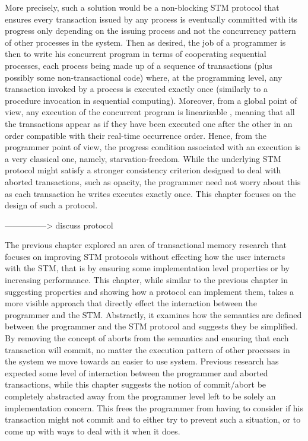 More precisely, such a solution would be a non-blocking STM protocol that ensures every transaction
issued by any process is eventually committed with its progress only depending
on the issuing process and not the concurrency pattern of other processes in the system.
Then as desired, the job of a
programmer is then to write his concurrent program in terms of cooperating sequential
processes, each process being made up of a sequence of transactions (plus possibly
some non-transactional code) where,
at the programming level, any transaction invoked by
a process is executed exactly once (similarly to a procedure invocation in sequential
computing).
Moreover, from a global point of view, any execution of the concurrent
program is linearizable \cite{HW90}, meaning that all the transactions appear as if they have
been executed one after the other in an order compatible with their real-time occurrence
order. Hence, from the programmer point of view, the progress condition associated
with an execution is a very classical one, namely, starvation-freedom.
While the underlying STM protocol might satisfy a stronger consistency criterion
designed to deal with aborted transactions,
such as opacity, the programmer need not worry about this as each transaction
he writes executes exactly once.
This chapter focuses on the design of such a protocol.

---------------> discuss protocol

The previous chapter explored an area of transactional memory
research that focuses on improving STM protocols without effecting
how the user interacts with the STM, that is by ensuring some implementation
level properties or by increasing performance.
This chapter, while similar to the previous chapter in suggesting properties
and showing how a protocol can implement them,
takes a more visible approach
that directly effect the interaction between the programmer and
the STM.
Abstractly, it examines how the semantics are defined between
the programmer and the STM protocol and suggests they be simplified.
By removing the concept of aborts from the semantics and
ensuring that each transaction will commit, no matter the 
execution pattern of other processes in the system
we move towards an easier to use system.
Previous research has expected some level of interaction
between the programmer and aborted transactions, while this
chapter suggests the notion of commit/abort be completely abstracted
away from the programmer level left to be solely an implementation
concern.
This frees the programmer from having to consider if his transaction
might not commit and to either try to prevent such a situation, or to 
come up with ways to deal with it when it does.

